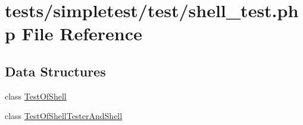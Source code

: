 \hypertarget{shell__test_8php}{\section{tests/simpletest/test/shell\-\_\-test.php File Reference}
\label{shell__test_8php}
}
\subsection*{Data Structures}
\begin{DoxyCompactItemize}
\item 
class \hyperlink{class_test_of_shell}{Test\-Of\-Shell}
\item 
class \hyperlink{class_test_of_shell_tester_and_shell}{Test\-Of\-Shell\-Tester\-And\-Shell}
\end{DoxyCompactItemize}
